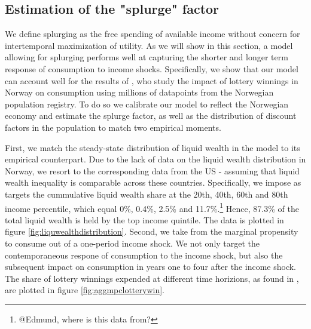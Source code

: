 \subsection{Estimation of the "splurge" factor}	

We define splurging as the free spending of available income without concern for intertemporal maximization of utility. As we will show in this section, a model allowing for splurging performs well at capturing the shorter and longer term response of consumption to income shocks. Specifically, we show that our model can account well for the results of \citet{fagereng_mpc_2021}, who study the impact of lottery winnings in Norway on consumption using millions of datapoints from the Norwegian population registry. To do so we calibrate our model to reflect the Norwegian economy and estimate the splurge factor, as well as the distribution of discount factors in the population to match two empirical moments. 	
	
First, we match the steady-state distribution of liquid wealth in the model to its empirical counterpart. Due to the lack of data on the liquid wealth distribution in Norway, we resort to the corresponding data from the US - assuming that liquid wealth inequality is comparable across these countries. Specifically, we impose as targets the cummulative liquid wealth share at the 20th, 40th, 60th and 80th income percentile, which equal 0\%, 0.4\%, 2.5\% and 11.7\%.\footnote{@Edmund, where is this data from?} Hence, 87.3\% of the total liquid wealth is  held by the top income quintile. The data is plotted in figure \ref{fig:liquwealthdistribution}.
Second, we take from \citet{fagereng_mpc_2021} the marginal propensity to consume out of a one-period income shock. We not only target the contemporaneous respone of consumption to the income shock, but also the subsequent impact on consumption in years one to four after the income shock. The share of lottery winnings expended at different time horizions, as found in \citet{fagereng_mpc_2021}, are plotted in figure \ref{fig:aggmpclotterywin}.


